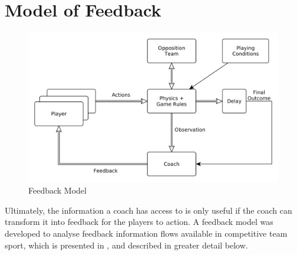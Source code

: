 \section{Model of Feedback}\label{sec:feedback-model}

\begin{figure}[htb]
\centering
\includegraphics[width=\linewidth]{figs/model/feedback_model.png}
\caption{Feedback Model \label{fig:feedback}}
\end{figure}

Ultimately, the information a coach has access to is only useful if the
coach can transform it into feedback for the players to action.
A feedback model was developed to analyse feedback information flows available in competitive team sport, which is presented in , and described in greater detail below.


